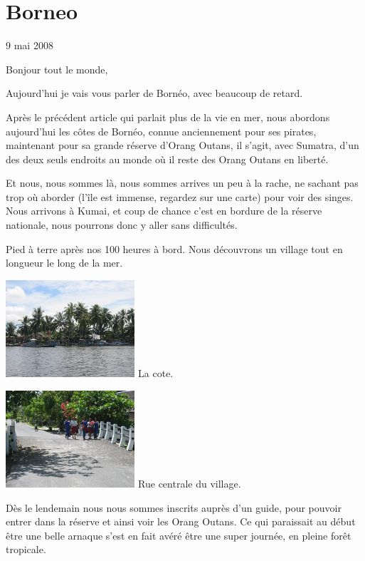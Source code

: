 \section{Borneo}

9 mai 2008

\begin{multicols}{2}

Bonjour tout le monde,

Aujourd'hui je vais vous parler de Bornéo, avec beaucoup de retard.

Après le précédent article qui parlait plus de la vie en mer, nous abordons aujourd'hui les côtes de Bornéo, connue anciennement pour ses pirates, maintenant pour sa grande réserve d'Orang Outans, il s'agit, avec Sumatra, d'un des deux seuls endroits au monde où il reste des Orang Outans en liberté.

Et nous, nous sommes là, nous sommes arrives un peu à la rache, ne sachant pas trop où aborder (l'île est immense, regardez sur une carte) pour voir des singes. Nous arrivons à Kumai, et coup de chance c'est en bordure de la réserve nationale, nous pourrons donc y aller sans difficultés.

Pied à terre après nos 100 heures à bord. Nous découvrons un village tout en longueur le long de la mer.

\hspace*{-0.65cm}
\includegraphics[width=4.8cm]{articles/Borneo/1210331303F4qq.jpg}
La cote.

\hspace*{-0.65cm}
\includegraphics[width=4.8cm]{articles/Borneo/1210331297ISJ9.jpg}
Rue centrale du village.

Dès le lendemain nous nous sommes inscrits auprès d'un guide, pour pouvoir entrer dans la réserve et ainsi voir les Orang Outans. Ce qui paraissait au début être une belle arnaque s'est en fait avéré être une super journée, en pleine forêt tropicale.


\end{multicols}
